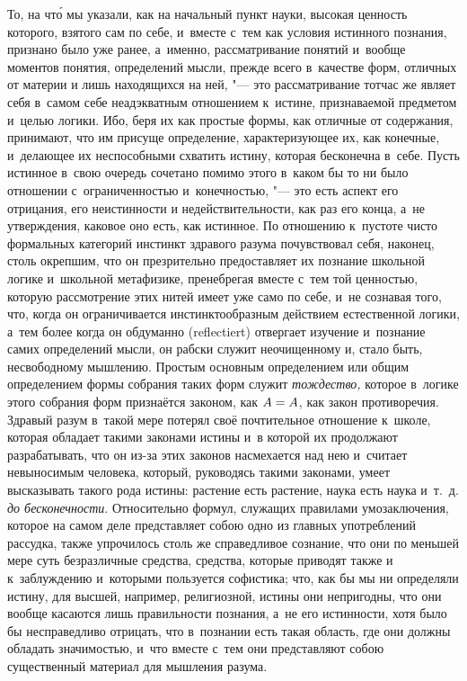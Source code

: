 То, на чт\'{о} мы указали, как на начальный пункт науки, высокая ценность
которого, взятого сам по себе, и~вместе с~тем как условия истинного познания,
признано было уже ранее, а~именно, рассматривание понятий и~вообще моментов
понятия, определений мысли, прежде всего в~качестве форм, отличных от материи и
лишь находящихся на ней, "--- это рассматривание тотчас же являет себя в~самом
себе неадэкватным отношением к~истине, признаваемой предметом и~целью логики.
Ибо, беря их как простые формы, как отличные от содержания, принимают, что им
присуще определение, характеризующее их, как конечные, и~делающее их
неспособными схватить истину, которая бесконечна в~себе. Пусть истинное в~свою
очередь сочетано помимо этого в~каком бы то ни было отношении с~ограниченностью
и~конечностью, "--- это есть аспект его отрицания, его неистинности и
недействительности, как раз его конца, а~не утверждения, каковое оно есть, как
истинное. По отношению к~пустоте чисто формальных категорий инстинкт здравого
разума почувствовал себя, наконец, столь окрепшим, что он презрительно
предоставляет их познание школьной логике и~школьной метафизике, пренебрегая
вместе с~тем той ценностью, которую рассмотрение этих нитей имеет уже само по
себе, и~не сознавая того, что, когда он ограничивается инстинктообразным
действием естественной логики, а~тем более когда он обдуманно (reflectiert)
отвергает изучение и~познание самих определений мысли, он рабски служит
неочищенному и, стало быть, несвободному мышлению. Простым основным
определением или общим определением формы собрания таких форм служит
{\em тождество,} которое в~логике этого собрания форм признаётся законом, как
$A\hm=A$, как закон противоречия. Здравый разум в~такой мере потерял своё
почтительное отношение к~школе, которая обладает такими законами истины и~в
которой их продолжают разрабатывать, что он из-за этих законов насмехается над
нею и~считает невыносимым человека, который, руководясь такими законами, умеет
высказывать такого рода истины: растение есть растение, наука есть наука
и~т.~д. {\em до бесконечности}. Относительно формул, служащих правилами
умозаключения, которое на самом деле представляет собою одно из главных
употреблений рассудка, также упрочилось столь же справедливое сознание, что они
по меньшей мере суть безразличные средства, средства, которые приводят также и
к~заблуждению и~которыми пользуется софистика; что, как бы мы ни определяли
истину, для высшей, например, религиозной, истины они непригодны, что они
вообще касаются лишь правильности познания, а~не его истинности, хотя было бы
несправедливо отрицать, что в~познании есть такая область, где они должны
обладать значимостью, и~что вместе с~тем они представляют собою существенный
материал для мышления разума.

